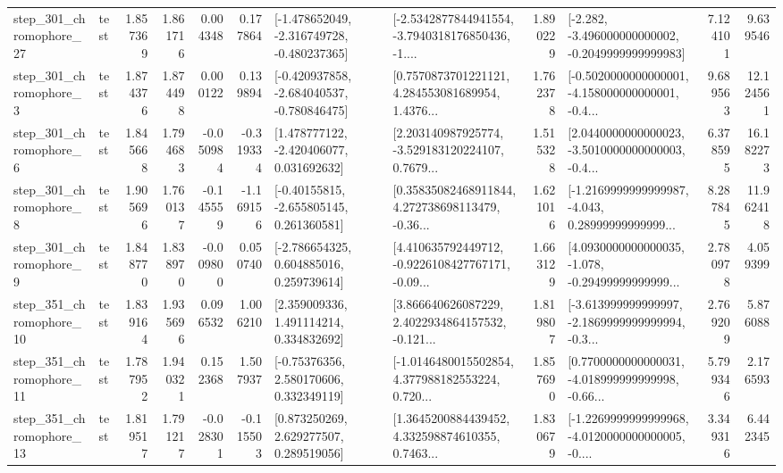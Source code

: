 \begin{tabular}{llrrrrllrlrr}
  step\_301\_chromophore\_27 &      test &      1.857369 &    1.861716 &      0.004348 &  0.177864 &  [-1.478652049, -2.316749728, -0.480237365] &  [-2.5342877844941554, -3.7940318176850436, -1.... &       1.890229 &  [-2.282, -3.496000000000002, -0.2049999999999983] &            7.124101 &          9.639546 \\
   step\_301\_chromophore\_3 &      test &      1.874376 &    1.874498 &      0.000122 &  0.139894 &  [-0.420937858, -2.684040537, -0.780846475] &  [0.7570873701221121, 4.284553081689954, 1.4376... &       1.762378 &  [-0.5020000000000001, -4.158000000000001, -0.4... &            9.689563 &         12.124561 \\
   step\_301\_chromophore\_6 &      test &      1.845668 &    1.794683 &     -0.050984 & -0.319334 &    [1.478777122, -2.420406077, 0.031692632] &  [2.203140987925774, -3.529183120224107, 0.7679... &       1.515328 &  [2.0440000000000023, -3.5010000000000003, -0.4... &            6.378595 &         16.182273 \\
   step\_301\_chromophore\_8 &      test &      1.905696 &    1.760137 &     -0.145559 & -1.169156 &    [-0.40155815, -2.655805145, 0.261360581] &  [0.35835082468911844, 4.272738698113479, -0.36... &       1.621016 &  [-1.2169999999999987, -4.043, 0.28999999999999... &            8.287845 &         11.962418 \\
   step\_301\_chromophore\_9 &      test &      1.848770 &    1.838970 &     -0.009800 &  0.050740 &    [-2.786654325, 0.604885016, 0.259739614] &  [4.410635792449712, -0.9226108427767171, -0.09... &       1.663129 &  [4.0930000000000035, -1.078, -0.29499999999999... &            2.780978 &          4.059399 \\
  step\_351\_chromophore\_10 &      test &      1.839164 &    1.935696 &      0.096532 &  1.006210 &     [2.359009336, 1.491114214, 0.334832692] &  [3.866640626087229, 2.4022934864157532, -0.121... &       1.819807 &  [-3.613999999999997, -2.1869999999999994, -0.3... &            2.769209 &          5.876088 \\
  step\_351\_chromophore\_11 &      test &      1.787952 &    1.940321 &      0.152368 &  1.507937 &     [-0.75376356, 2.580170606, 0.332349119] &  [-1.0146480015502854, 4.377988182553224, 0.720... &       1.857690 &  [0.7700000000000031, -4.018999999999998, -0.66... &            5.799346 &          2.176593 \\
  step\_351\_chromophore\_13 &      test &      1.819517 &    1.791217 &     -0.028301 & -0.115503 &     [0.873250269, 2.629277507, 0.289519056] &  [1.3645200884439452, 4.332598874610355, 0.7463... &       1.830679 &  [-1.2269999999999968, -4.0120000000000005, -0.... &            3.349316 &          6.442345 \\

\end{tabular}
